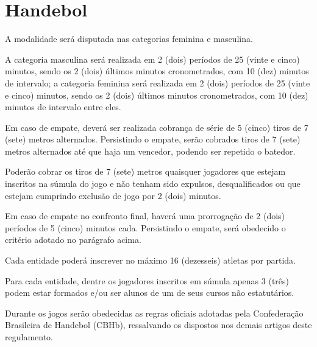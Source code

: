 {\let\clearpage\relax \chapter{Handebol}}

\begin{article}
	A modalidade será disputada nas categorias feminina e masculina.
\end{article}

\begin{article}
	A categoria masculina será realizada em 2 (dois) períodos de 25 (vinte e cinco) minutos, sendo os 2 (dois) últimos minutos cronometrados, com 10 (dez) minutos de intervalo; a categoria feminina será realizada em 2 (dois) períodos de 25 (vinte e cinco) minutos, sendo os 2 (dois) últimos minutos cronometrados, com 10 (dez) minutos de intervalo entre eles.

	\begin{xparagraph}
		Em caso de empate, deverá ser realizada cobrança de série de 5 (cinco) tiros de 7 (sete) metros alternados. Persistindo o empate, serão cobrados tiros de 7 (sete) metros alternados até que haja um vencedor, podendo ser repetido o batedor.
	\end{xparagraph}

	\begin{xparagraph}
		Poderão cobrar os tiros de 7 (sete) metros quaisquer jogadores que estejam inscritos na súmula do jogo e não tenham sido expulsos, desqualificados ou que estejam cumprindo exclusão de jogo por 2 (dois) minutos.
	\end{xparagraph}

	\begin{xparagraph}
		Em caso de empate no confronto final, haverá uma prorrogação de 2 (dois) períodos de 5 (cinco) minutos cada. Persistindo o empate, será obedecido o critério adotado no parágrafo acima.
	\end{xparagraph}
\end{article}

\begin{article}
	Cada entidade poderá inscrever no máximo 16 (dezesseis) atletas por partida.
\end{article}

\begin{article}
	Para cada entidade, dentre os jogadores inscritos em súmula apenas 3 (três) podem estar formados e/ou ser alunos de um de seus cursos não estatutários.
\end{article}

\begin{article}
	Durante os jogos serão obedecidas as regras oficiais adotadas pela Confederação Brasileira de Handebol (CBHb), ressalvando os dispostos nos demais artigos deste regulamento.
\end{article}
